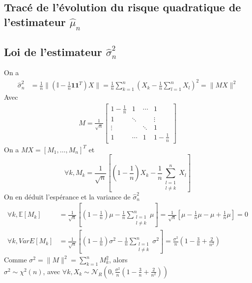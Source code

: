 \documentclass{report}
\begin{document}
		\subsection{Tracé de l'évolution du risque quadratique de l'estimateur $\hat\mu_n$}
		\subsection{Loi de l'estimateur $\hat\sigma^2_n$}
			On a
			\begin{align*}
				\hat\sigma^2_n &= \frac{1}{n} \lVert (\mathbb{I} - \frac{1}{n}\textbf{1}\textbf{1}^T)X \rVert = \frac{1}{n} \sum\limits_{k=1}^n (X_k - \frac{1}{n}\sum\limits_{l=1}^n X_l)^2 = \lVert MX \rVert^2
			\end{align*}
			Avec
			\begin{align*}
				M = \frac{1}{\sqrt n}
				\left[
				\begin{array}{cccc}
					1-\frac{1}{n} & 1 & \cdots & 1 \\
					1 & \ddots & & \vdots \\
					\vdots & & \ddots & 1 \\
					1 &  \cdots & 1 & 1-\frac{1}{n}
				\end{array}
				\right]
			\end{align*}
			On a $MX = [M_1, \ldots, M_n]^T$ et
			\[ \forall k, M_k = \frac{1}{\sqrt n}[ (1-\frac{1}{n})X_k -\frac{1}{n}\sum\limits_{\substack{
            l=1\\
            l \neq k}}^n X_l ] \]
            On en déduit l'espérance et la variance de $\hat\sigma^2_n$\\
            \begin{align*}
            	\forall k, \mathbb{E}[M_k] &= \frac{1}{\sqrt n}[(1-\frac{1}{n})\mu - \frac{1}{n}\sum\limits_{\substack{
            	l=1\\
            	l \neq k}}^n \mu] = \frac{1}{\sqrt n}[ \mu - \frac{1}{n}\mu - \mu + \frac{1}{n}\mu ] = 0 \\
            	\forall k, Var{E}[M_k] &= \frac{1}{\sqrt n}[(1-\frac{1}{n})\sigma^2 - \frac{1}{n}\sum\limits_{\substack{
            	l=1\\
            	l \neq k}}^n \sigma^2] = \frac{\sigma^2}{n}(1-\frac{3}{n}+\frac{2}{n^2})
            \end{align*}
            Comme $\sigma^2 = \lVert M \rVert^2 = \sum\limits_{k=1}^n M_k^2$, alors \\
            $\sigma^2 \sim \chi^2(n)$, avec $\forall k, X_k \sim \mathcal{N}_{R}(0, \frac{\sigma^2}{n}(1-\frac{3}{n}+\frac{2}{n^2}))$
\end{document}
